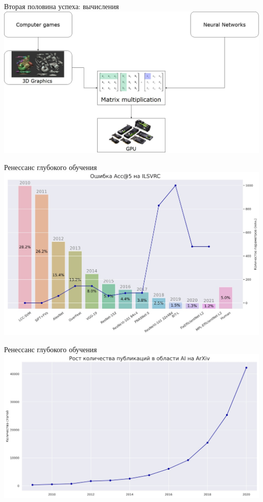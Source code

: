 \documentclass[aspectratio=169]{beamer}
\begin{document}
\begin{frame}{Вторая половина успеха: вычисления}
    \centering
    \includegraphics[width=.86\linewidth]{graphs/fig26.jpg}
\end{frame}

\begin{frame}{Ренессанс глубокого обучения}
    \centering
    \includegraphics[width=.75\linewidth]{graphs/fig27.jpg}
\end{frame}

\begin{frame}{Ренессанс глубокого обучения}
    \centering
    \includegraphics[width=.85\linewidth]{graphs/fig28.jpg}
\end{frame}
\end{document}
